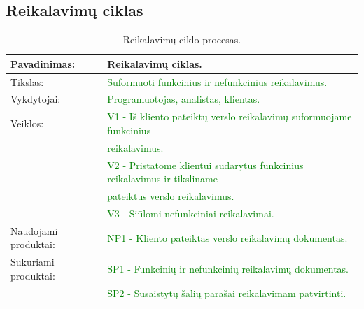 \documentclass{VUMIFPSkursinis}
\begin{document}
	\subsection{Reikalavimų ciklas}
	\begin{center}
		\begin{table}[ht]
			\caption{Reikalavimų ciklo procesas.}
			\begin{tabular}{ | l | l | }
				\hline
				Pavadinimas:		& Reikalavimų ciklas.												\\ \hline
				Tikslas:		& \textcolor{green}{Suformuoti funkcinius ir nefunkcinius reikalavimus.	}							\\ \hline
				Vykdytojai:		& \textcolor{green}{Programuotojas, analistas, klientas.}										\\ \hline
				Veiklos:		& \textcolor{green}{V1 - Iš kliento pateiktų verslo reikalavimų suformuojame funkcinius} \\ &\textcolor{green}{ reikalavimus. }			\\
							& \textcolor{green}{V2 - Pristatome klientui sudarytus funkcinius reikalavimus ir tiksliname} \\& \textcolor{green}{pateiktus verslo reikalavimus.}	\\
							& \textcolor{green}{V3 - Siūlomi nefunkciniai reikalavimai.}									\\ \hline
				Naudojami produktai:	& \textcolor{green}{NP1 - Kliento pateiktas verslo reikalavimų dokumentas.}							\\ \hline
				Sukuriami produktai:	& \textcolor{green}{SP1 - Funkcinių ir nefunkcinių reikalavimų dokumentas.}							\\ \hline
							& \textcolor{green}{SP2 - Susaistytų šalių parašai reikalavimam patvirtinti.}							\\ \hline
			\end{tabular}
		\end{table}
	\end{center}
\end{document}
